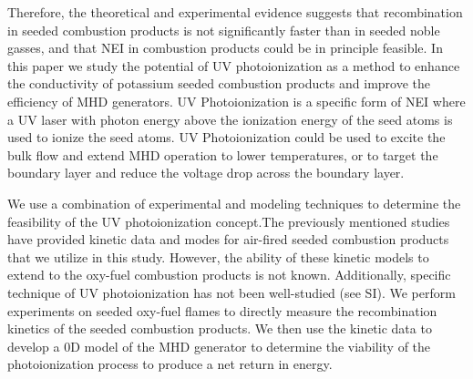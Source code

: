 Therefore, the theoretical and experimental evidence suggests that recombination in seeded combustion products is not significantly faster than in seeded noble gasses, and that NEI in combustion products could be in principle feasible. In this paper we study the potential of UV photoionization as a method to enhance the conductivity of potassium seeded combustion products and improve the efficiency of MHD generators. UV Photoionization is a specific form of NEI where a UV laser with photon energy above the ionization energy of the seed atoms is used to ionize the seed atoms. UV Photoionization could be used to excite the bulk flow and extend MHD operation to lower temperatures, or to target the boundary layer and reduce the voltage drop across the boundary layer.

We use a combination of experimental and modeling techniques to determine the feasibility of the UV photoionization concept.The previously mentioned studies have provided kinetic data and modes for air-fired seeded combustion products that we utilize in this study. However, the ability of these kinetic models to extend to the oxy-fuel combustion products is not known. Additionally, specific technique of UV photoionization has not been well-studied (see SI). We perform experiments on seeded oxy-fuel flames to directly measure the recombination kinetics of the seeded combustion products. We then use the kinetic data to develop a 0D model of the MHD generator to determine the viability of the photoionization process to produce a net return in energy.